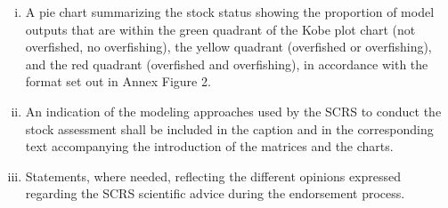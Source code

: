 \documentclass[a4paper, 11pt, oldtoc]{artikel1}
\begin{document}
\begin{enumerate}
\begin{enumerate}[i)]
      \item  A pie chart summarizing the stock status showing the proportion of model outputs that are within the green quadrant of the Kobe plot chart (not overfished, no overfishing), the yellow quadrant (overfished or overfishing), and the red quadrant (overfished and overfishing), in accordance with the format set out in Annex Figure 2.
      \item  An indication of the modeling approaches used by the SCRS to conduct the stock assessment shall be included in the caption and in the corresponding text accompanying the introduction of the matrices and the charts.
      \item  Statements, where needed, reflecting the different opinions expressed regarding the SCRS scientific advice during the endorsement process.
    \end{enumerate}


\end{enumerate}
\end{document}
